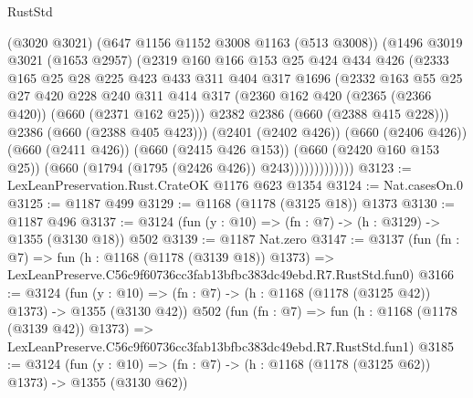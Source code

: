 \begin{lexlean}{RustStd}
\begin{coremodule}
                      (@3020 @3021)
                      (@647 @1156 @1152 @3008 @1163 (@513 @3008))
                      (@1496
                        @3019
                        @3021
                        (@1653 @2957)
                        (@2319
                          @160
                          @166
                          @153
                          @25
                          @424
                          @434
                          @426
                          (@2333
                            @165
                            @25
                            @28
                            @225
                            @423
                            @433
                            @311
                            @404
                            @317
                            @1696
                            (@2332
                              @163
                              @55
                              @25
                              @27
                              @420
                              @228
                              @240
                              @311
                              @414
                              @317
                              (@2360 @162 @420 (@2365 (@2366 @420)) (@660 (@2371 @162 @25)))
                              @2382
                              @2386
                              (@660 (@2388 @415 @228)))
                            @2386
                            (@660 (@2388 @405 @423)))
                          (@2401 (@2402 @426))
                          (@660 (@2406 @426))
                          (@660 (@2411 @426))
                          (@660 (@2415 @426 @153))
                          (@660 (@2420 @160 @153 @25))
                          (@660 (@1794 (@1795 (@2426 @426)) @243)))))))))))))
@3123 := LexLeanPreservation.Rust.CrateOK @1176 @623 @1354
@3124 := Nat.casesOn.{0}
@3125 := @1187 @499
@3129 := @1168 (@1178 (@3125 @18)) @1373
@3130 := @1187 @496
@3137 := @3124 (fun (y : @10) => (fn : @7) -> (h : @3129) -> @1355 (@3130 @18)) @502
@3139 := @1187 Nat.zero
@3147 := @3137
    (fun (fn : @7) =>
    fun (h : @1168 (@1178 (@3139 @18)) @1373) =>
    LexLeanPreserve.C56c9f60736cc3fab13bfbc383dc49ebd.R7.RustStd.fun0)
@3166 := @3124
    (fun (y : @10) => (fn : @7) -> (h : @1168 (@1178 (@3125 @42)) @1373) -> @1355 (@3130 @42))
    @502
    (fun (fn : @7) =>
    fun (h : @1168 (@1178 (@3139 @42)) @1373) =>
    LexLeanPreserve.C56c9f60736cc3fab13bfbc383dc49ebd.R7.RustStd.fun1)
@3185 := @3124
    (fun (y : @10) => (fn : @7) -> (h : @1168 (@1178 (@3125 @62)) @1373) -> @1355 (@3130 @62))

\end{coremodule}
\end{lexlean}
